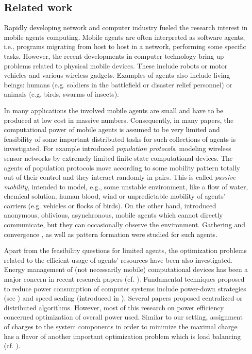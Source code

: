 \documentclass{article}
\begin{document}
\subsection{Related work}\label{s:related}

Rapidly developing network and computer industry fueled the research interest in mobile agents computing. Mobile agents are often interpreted as 
software agents, i.e., programs migrating from host to host in a network, performing some specific tasks. However, the recent developments in computer technology bring up problems related to physical mobile devices. These include robots or motor vehicles and various wireless gadgets.
Examples of agents also include living beings: humans (e.g. soldiers in the battlefield or disaster relief personnel) or animals (e.g. birds, swarms of insects). 

In many applications the involved mobile agents are small and have to be produced at low cost in massive numbers. Consequently, in many papers, the computational power of mobile agents is assumed to be very limited and feasibility of some important distributed tasks for such collections of agents is investigated. For example \cite{AA06} introduced {\em population protocols}, modeling wireless sensor networks by extremely limited finite-state computational devices. The agents of population protocols move according to some mobility pattern totally out of their control and they interact randomly in pairs. This is called {\em passive mobility}, intended to model, e.g., some unstable environment, like a flow of water, chemical solution, human blood, wind or unpredictable mobility of agents' carriers (e.g. vehicles or flocks of birds). On the other hand,
\cite{SY} introduced anonymous, oblivious, asynchronous, mobile agents which cannot directly communicate, but they can occasionally observe the environment. Gathering and convergence  \cite{AOSY,CFPS,CP,C15}, as well as pattern formation \cite{DFSY,FPSW,SY,YS} were studied for such agents.

Apart from the feasibility questions for limited agents, the optimization problems related to the efficient usage of agents' resources have been also investigated. Energy management of (not necessarily mobile) computational devices has been a major concern in recent research papers (cf. \cite{Albers}). Fundamental techniques proposed to reduce power consumption of computer systems include power-down strategies (see \cite{Albers,AIS,ISG}) and speed scaling (introduced in \cite{YDS}). Several papers proposed centralized \cite{Bunde,SL,YDS} or distributed  \cite{Albers,Ambuhl,AIS,ISG} algorithms. However, most of this research on power efficiency concerned optimization of overall power used. Similar to our setting, assignment of charges to the system components in order to minimize the maximal charge has a flavor of another important optimization problem which is load balancing (cf. \cite{Azar}).
\end{document}
